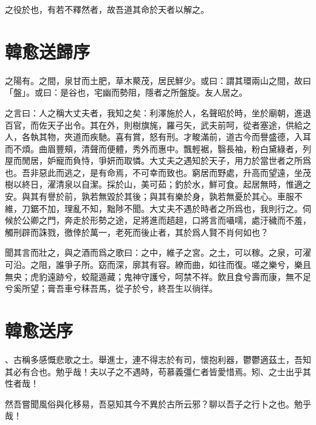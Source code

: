 之役於也，有若不釋然者，故吾道其命於天者以解之。

\section[送李愿歸盤谷序\quad{\small 韓愈}]{{\normalsize 韓愈}\quad 送歸序}

之陽有。之間，泉甘而土肥，草木藂茂，居民鮮少。或曰：謂其環兩山之間，故曰「盤」。或曰：是谷也，宅幽而勢阻，隱者之所盤旋。友人居之。

之言曰：人之稱大丈夫者，我知之矣：利澤施於人，名聲昭於時，坐於廟朝，進退百官，而佐天子出令。其在外，則樹旗旄，羅弓矢，武夫前呵，從者塞途，供給之人，各執其物，夾道而疾馳。喜有賞，怒有刑。才畯滿前，道古今而譽盛德，入耳而不煩。曲眉豐頰，清聲而便體，秀外而惠中。飄輕裾，翳長袖，粉白黛綠者，列屋而閒居，妒寵而負恃，爭妍而取憐。大丈夫之遇知於天子，用力於當世者之所爲也。吾非惡此而逃之，是有命焉，不可幸而致也。窮居而野處，升高而望遠，坐茂樹以終日，濯清泉以自潔。採於山，美可茹；釣於水，鮮可食。起居無時，惟適之安。與其有譽於前，孰若無毀於其後；與其有樂於身，孰若無憂於其心。車服不維，刀鋸不加，理亂不知，黜陟不聞。大丈夫不遇於時者之所爲也，我則行之。伺候於公卿之門，奔走於形勢之途，足將進而趦趄，口將言而囁嚅，處汙穢而不羞，觸刑辟而誅戮，徼倖於萬一，老死而後止者，其於爲人賢不肖何如也？

聞其言而壯之，與之酒而爲之歌曰：之中，維子之宮。之土，可以稼。之泉，可濯可沿。之阻，誰爭子所。窈而深，廓其有容。繚而曲，如往而復。嗟之樂兮，樂且無央；虎豹遠跡兮，蛟龍遁藏；鬼神守護兮，呵禁不祥。飲且食兮壽而康，無不足兮奚所望；膏吾車兮秣吾馬，從子於兮，終吾生以徜徉。

\section[送董邵南序\quad{\small 韓愈}]{{\normalsize 韓愈}\quad 送序}
、古稱多感慨悲歌之士。舉進士，連不得志於有司，懷抱利器，鬱鬱適茲土，吾知其必有合也。勉乎哉！夫以子之不遇時，苟慕義彊仁者皆愛惜焉。矧、之士出乎其性者哉！

然吾嘗聞風俗與化移易，吾惡知其今不異於古所云邪？聊以吾子之行卜之也。勉乎哉！

